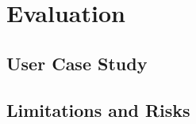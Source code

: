
\chapter{Evaluation}

\ifpdf
    \graphicspath{{Chapters/Evaluation/Figs/}{Chapters/Evaluation/Figs/}{Chapters/Evaluation/Figs/}}
\else
    \graphicspath{{Chapters/Evaluation/Figs/}{Chapters/Evaluation/Figs/}}
\fi


\section{User Case Study}
\section{Limitations and Risks}